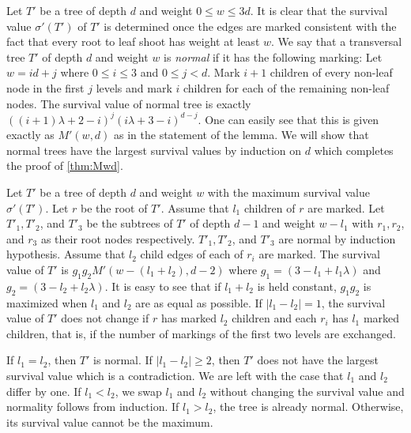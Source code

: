 \documentclass[10pt,a4paper]{article}
\newcommand{\total}{\sigma}
\begin{document}
Let $T'$ be a tree of depth $d$ and weight $0\leq w\leq 3d$.
It is clear that the survival value $\total'(T')$ of $T'$ is determined once
the edges are marked consistent with the fact that every root to leaf shoot has weight at least $w$.
We say that a transversal tree $T'$ of depth $d$ and weight $w$ is \emph{normal} if it has the following marking:
Let $w=id+j$ where $0\leq i\leq 3$ and $0\leq j<d$.
Mark $i+1$ children of every non-leaf node in the 
first $j$ levels and mark $i$ children
for each of the remaining non-leaf nodes. The survival value of normal tree is exactly $((i+1)\lambda + 2 - i)^j(i\lambda + 3 - i)^{d - j}$. One can easily see that this is given exactly as $M'(w,d)$ as in the statement of the lemma.
We will show that normal trees have the largest
survival values by induction on $d$ which completes the proof
of \cref{thm:Mwd}.

Let $T'$ be a tree of depth $d$ and weight $w$ with the maximum survival value $\total'(T')$.
Let $r$ be the root of $T'$. Assume that $l_1$ children of $r$ are marked.
Let $T'_1, T'_2$, and $T'_3$ be the subtrees of $T'$ of depth $d-1$ 
and weight $w-l_1$ with $r_1, r_2$, and $r_3$ as their root nodes respectively.
$T'_1, T'_2$, and $T'_3$ are normal by induction hypothesis.
Assume that $l_2$ child edges of each of $r_i$ are marked.
The survival value of $T'$ is 
$g_1 g_2 M'(w-(l_1+l_2), d-2)$ where
$g_1= (3-l_1 +l_1 \lambda)$ and $g_2=(3-l_2 + l_2\lambda)$.
It is easy to see that if $l_1+l_2$ is held constant, $g_1 g_2$ is maximized when $l_1$ and $l_2$
are as equal as possible. If $|l_1-l_2|=1$, the survival value of $T'$ does not change if $r$ has marked $l_2$ children and 
each $r_i$ has $l_1$ marked children, that is, if the number of markings of the first two levels are exchanged.

If $l_1 = l_2$, then $T'$ is normal.
If $|l_1-l_2|\geq 2$, then $T'$ does not have the largest
survival value which is a contradiction.
We are left with the case that  $l_1$ and $l_2$ differ by one. If $l_1<l_2$, we swap $l_1$ and $l_2$ without changing the survival value and normality follows from induction. If $l_1>l_2$, the tree is already normal. Otherwise, its survival value cannot be the maximum. 


\end{document}
